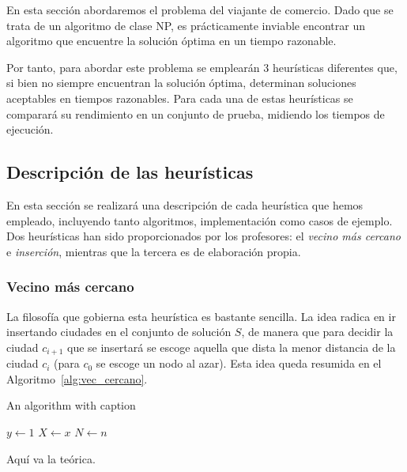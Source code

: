En esta sección abordaremos el problema del viajante de comercio. Dado que
se trata de un algoritmo de clase NP, es prácticamente inviable encontrar 
un algoritmo que encuentre la solución óptima en un tiempo razonable.

Por tanto, para abordar este problema se emplearán 3 heurísticas diferentes que,
si bien no siempre encuentran la solución óptima, determinan soluciones 
aceptables en tiempos razonables. Para cada una de
estas heurísticas se comparará su rendimiento en un conjunto de prueba,
midiendo los tiempos de ejecución. 

\subsection{Descripción de las heurísticas}

En esta sección se realizará una descripción de cada heurística que hemos 
empleado, incluyendo tanto algoritmos, implementación como casos de ejemplo.
Dos heurísticas han sido proporcionados por los profesores: el \textit{vecino
más cercano} e \textit{inserción}, mientras que la tercera es de
elaboración propia.

\subsubsection{Vecino más cercano}

La filosofía que gobierna esta heurística es bastante sencilla. La idea 
radica en ir insertando ciudades en el conjunto de solución $S$, de manera
que para decidir la ciudad $c_{i+1}$ que se insertará se escoge aquella que
dista la menor distancia de la ciudad $c_i$ (para $c_0$ se escoge
un nodo al azar). Esta idea queda resumida en el Algoritmo~\ref{alg:vec_cercano}. 

\begin{algorithm}
    \caption{An algorithm with caption}\label{alg:vec_cercano}
    $y \gets 1$\;
    $X \gets x$\;
    $N \gets n$\;
\end{algorithm}


Aquí va la teórica.


